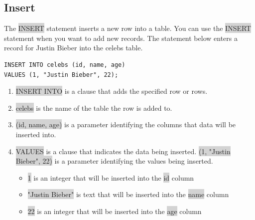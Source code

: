 \documentclass[11pt]{article}
\begin{document}
\subsection{Insert}
The \colorbox{lightgray}{INSERT} statement inserts a new row into a table. You can use the \colorbox{lightgray}{INSERT} statement when you want to add new records. The statement below enters a record for Justin Bieber into the celebs table.
\begin{lstlisting}
INSERT INTO celebs (id, name, age) 
VALUES (1, "Justin Bieber", 22);
\end{lstlisting}
\begin{enumerate}[leftmargin = *]
\item \colorbox{lightgray}{INSERT INTO} is a clause that adds the specified row or rows.
\item \colorbox{lightgray}{celebs} is the name of the table the row is added to.
\item \colorbox{lightgray}{(id, name, age)} is a parameter identifying the columns that data will be inserted into.
\item \colorbox{lightgray}{VALUES} is a clause that indicates the data being inserted. \colorbox{lightgray}{(1, "Justin Bieber", 22)} is a parameter identifying the values being inserted.
\begin{itemize}
\item \colorbox{lightgray}{1} is an integer that will be inserted into the \colorbox{lightgray}{id} column
\item \colorbox{lightgray}{"Justin Bieber"} is text that will be inserted into the \colorbox{lightgray}{name} column
\item \colorbox{lightgray}{22} is an integer that will be inserted into the \colorbox{lightgray}{age} column
\end{itemize}
\end{enumerate}
\end{document}
